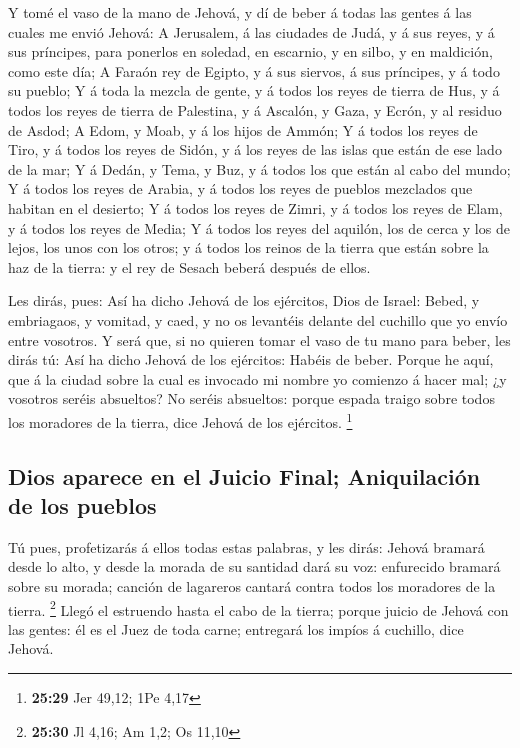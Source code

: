  Y tomé el vaso de la mano de Jehová, y dí de beber á todas
las gentes á las cuales me envió Jehová:  A Jerusalem, á
las ciudades de Judá, y á sus reyes, y á sus príncipes, para ponerlos en
soledad, en escarnio, y en silbo, y en maldición, como este día;
 A Faraón rey de Egipto, y á sus siervos, á sus príncipes,
y á todo su pueblo;  Y á toda la mezcla de gente, y á todos
los reyes de tierra de Hus, y á todos los reyes de tierra de Palestina,
y á Ascalón, y Gaza, y Ecrón, y al residuo de Asdod;  A
Edom, y Moab, y á los hijos de Ammón;  Y á todos los reyes
de Tiro, y á todos los reyes de Sidón, y á los reyes de las islas que
están de ese lado de la mar;  Y á Dedán, y Tema, y Buz, y á
todos los que están al cabo del mundo;  Y á todos los reyes
de Arabia, y á todos los reyes de pueblos mezclados que habitan en el
desierto;  Y á todos los reyes de Zimri, y á todos los
reyes de Elam, y á todos los reyes de Media;  Y á todos los
reyes del aquilón, los de cerca y los de lejos, los unos con los otros;
y á todos los reinos de la tierra que están sobre la haz de la tierra: y
el rey de Sesach beberá después de ellos.

 Les dirás, pues: Así ha dicho Jehová de los ejércitos,
Dios de Israel: Bebed, y embriagaos, y vomitad, y caed, y no os
levantéis delante del cuchillo que yo envío entre vosotros.
 Y será que, si no quieren tomar el vaso de tu mano para
beber, les dirás tú: Así ha dicho Jehová de los ejércitos: Habéis de
beber.  Porque he aquí, que á la ciudad sobre la cual es
invocado mi nombre yo comienzo á hacer mal; ¿y vosotros seréis
absueltos? No seréis absueltos: porque espada traigo sobre todos los
moradores de la tierra, dice Jehová de los ejércitos. \footnote{\textbf{25:29}
  Jer 49,12; 1Pe 4,17}

\hypertarget{dios-aparece-en-el-juicio-final-aniquilaciuxf3n-de-los-pueblos}{%
\subsection{Dios aparece en el Juicio Final; Aniquilación de los
pueblos}\label{dios-aparece-en-el-juicio-final-aniquilaciuxf3n-de-los-pueblos}}

 Tú pues, profetizarás á ellos todas estas palabras, y les
dirás: Jehová bramará desde lo alto, y desde la morada de su santidad
dará su voz: enfurecido bramará sobre su morada; canción de lagareros
cantará contra todos los moradores de la tierra. \footnote{\textbf{25:30}
  Jl 4,16; Am 1,2; Os 11,10}  Llegó el estruendo hasta el
cabo de la tierra; porque juicio de Jehová con las gentes: él es el Juez
de toda carne; entregará los impíos á cuchillo, dice Jehová.

